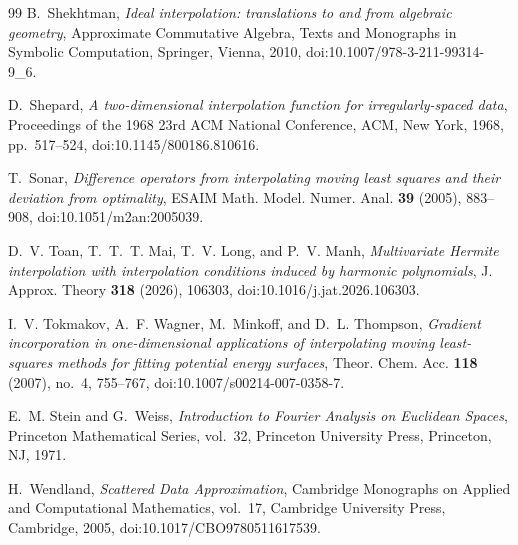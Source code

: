 \documentclass[12pt]{amsart}
\theoremstyle{definition}
\theoremstyle{remark}
\begin{document}
\begin{thebibliography}{99}
B.~Shekhtman, \emph{Ideal interpolation: translations to and from algebraic geometry}, Approximate Commutative Algebra, Texts and Monographs in Symbolic Computation, Springer, Vienna, 2010, doi:10.1007/978-3-211-99314-9\_6.

D.~Shepard, \emph{A two-dimensional interpolation function for irregularly-spaced data}, Proceedings of the 1968 23rd ACM National Conference, ACM, New York, 1968, pp.~517--524, doi:10.1145/800186.810616.

T.~Sonar, \emph{Difference operators from interpolating moving least squares and their deviation
from optimality}, ESAIM Math. Model. Numer. Anal. \textbf{39} (2005), 883--908,
doi:10.1051/m2an:2005039.

D.~V. Toan, T.~T.~T. Mai, T.~V. Long, and P.~V. Manh, \emph{Multivariate {H}ermite interpolation with
interpolation conditions induced by harmonic polynomials}, J. Approx. Theory \textbf{318} (2026),
106303, doi:10.1016/j.jat.2026.106303.

I.~V. Tokmakov, A.~F. Wagner, M.~Minkoff, and D.~L. Thompson, \emph{Gradient incorporation in
one-dimensional applications of interpolating moving least-squares methods for fitting
potential energy surfaces}, Theor. Chem. Acc. \textbf{118} (2007), no.~4, 755--767,
doi:10.1007/s00214-007-0358-7.

E.~M. Stein and G.~Weiss, \emph{Introduction to {F}ourier Analysis on {E}uclidean Spaces},
Princeton Mathematical Series, vol.~32, Princeton University Press, Princeton, NJ, 1971.

H.~Wendland, \emph{Scattered Data Approximation}, Cambridge Monographs on Applied and Computational Mathematics, vol.~17, Cambridge University Press, Cambridge, 2005, doi:10.1017/CBO9780511617539.


\end{thebibliography}
\end{document}
